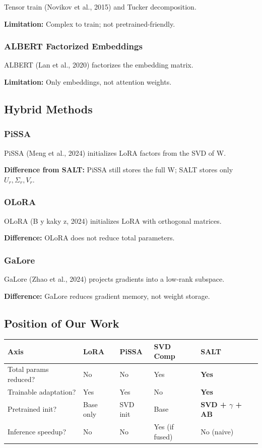 Tensor train (Novikov et al., 2015) and Tucker decomposition.

\textbf{Limitation:} Complex to train; not pretrained-friendly.

\subsubsection{ALBERT Factorized Embeddings}

ALBERT (Lan et al., 2020) factorizes the embedding matrix.

\textbf{Limitation:} Only embeddings, not attention weights.

\subsection{Hybrid Methods}

\subsubsection{PiSSA}

PiSSA (Meng et al., 2024) initializes LoRA factors from the SVD of W.

\textbf{Difference from SALT:} PiSSA still stores the full W; SALT stores only 
$U_r, \Sigma_r, V_r$.

\subsubsection{OLoRA}

OLoRA (B y kaky z, 2024) initializes LoRA with orthogonal matrices.

\textbf{Difference:} OLoRA does not reduce total parameters.

\subsubsection{GaLore}

GaLore (Zhao et al., 2024) projects gradients into a low-rank subspace.

\textbf{Difference:} GaLore reduces gradient memory, not weight storage.

\subsection{Position of Our Work}

\begin{table}[H]
\centering
\small
\begin{tabular}{lllll}
\toprule
\textbf{Axis} & \textbf{LoRA} & \textbf{PiSSA} & \textbf{SVD Comp} & \textbf{SALT} \\
\midrule
Total params reduced? & No & No & Yes & \textbf{Yes} \\
Trainable adaptation? & Yes & Yes & No & \textbf{Yes} \\
Pretrained init? & Base only & SVD init & Base & \textbf{SVD + $\gamma$ + AB} \\
Inference speedup? & No & No & Yes (if fused) & No (naive) \\
\bottomrule
\end{tabular}
\end{table}

